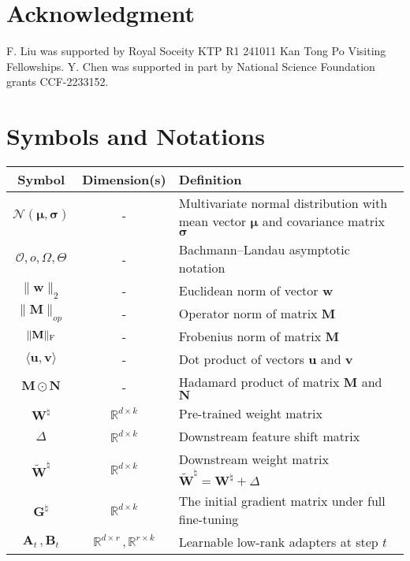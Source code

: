 \documentclass[11pt]{article}
\newcommand{\enableaddcontentsline}{%
  \let\addcontentsline\savedaddcontentsline
}
\begin{document}
\section*{Acknowledgment}
F. Liu was supported by Royal Soceity KTP R1 241011 Kan Tong Po Visiting Fellowships. Y. Chen was supported in part by National Science Foundation grants CCF-2233152.




\newpage
\appendix
\onecolumn
\enableaddcontentsline
\tableofcontents
\newpage
\section{Symbols and Notations}
\label{app:notation}
\begin{table}[h!]
\fontsize{8}{10}\selectfont
\centering
\renewcommand{\arraystretch}{1.2}
\begin{tabular}{c|c|l}
\hline
\textbf{Symbol} & \textbf{Dimension(s)} & \textbf{Definition} \\
\hline
$\mathcal{N}(\bm \mu, \bm \sigma)$ & - & Multivariate normal distribution with mean vector $\bm \mu$ and covariance matrix $\bm \sigma$ \\
$\mathcal{O}, o, \Omega, \Theta$ & - & Bachmann–Landau asymptotic notation \\
$\|\bm w\|_2$ & - & Euclidean norm of vector $\bm w$ \\
$\|\mathbf{M}\|_{op}$ & - & Operator norm of matrix $\mathbf{M}$ \\
$\|\mathbf{M}\|_{\rm F}$ & - & Frobenius norm of matrix $\mathbf{M}$ \\
$\langle \bm u, \bm v \rangle$ & - & Dot product of vectors $\bm u$ and $\bm v$ \\
$\mathbf{M}\odot \mathbf{N}$ & - & Hadamard product of matrix $\mathbf{M}$ and $\mathbf{N}$\\
\hline
$\bm W^\natural$ & $\mathbb{R}^{d\times k}$ & Pre-trained weight matrix\\
$\Delta$ & $\mathbb{R}^{d\times k}$ & Downstream feature shift matrix\\
$\widetilde{\bm W}^\natural$ & $\mathbb{R}^{d\times k}$ & Downstream weight matrix $\widetilde{\bm W}^\natural=\bm W^\natural+\Delta$\\
$\bm G^\natural$ & $\mathbb{R}^{d\times k}$ & The initial gradient matrix under full fine-tuning\\
$\bm A_t\,,\bm B_t$ & $\mathbb{R}^{d\times r}\,,\mathbb{R}^{r\times k}$ & Learnable low-rank adapters at step $t$\\

\end{tabular}
\end{table}
\end{document}
